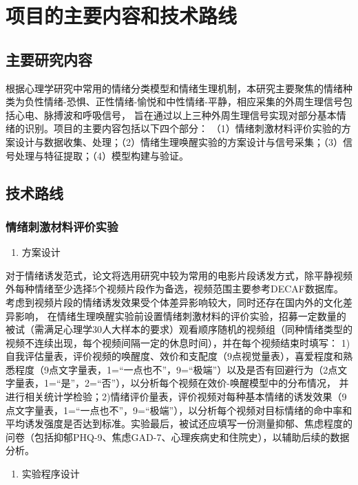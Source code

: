 \section{项目的主要内容和技术路线}

\subsection{主要研究内容}
根据心理学研究中常用的情绪分类模型和情绪生理机制，本研究主要聚焦的情绪种类为负性情绪-恐惧、正性情绪-愉悦和中性情绪-平静，相应采集的外周生理信号包括心电、脉搏波和呼吸信号，
旨在通过以上三种外周生理信号实现对部分基本情绪的识别。项目的主要内容包括以下四个部分：
（1）情绪刺激材料评价实验的方案设计与数据收集、处理；（2）情绪生理唤醒实验的方案设计与信号采集；（3）信号处理与特征提取；（4）模型构建与验证。

\subsection{技术路线}
\subsubsection{情绪刺激材料评价实验}
\begin{enumerate}[\hspace{2em}1.]
    \item 方案设计
\end{enumerate}

对于情绪诱发范式，论文将选用研究中较为常用的电影片段诱发方式，除平静视频外每种情绪至少选择5个视频片段作为备选，视频范围主要参考DECAF数据库\cite{DECAF2015}。考虑到视频片段的情绪诱发效果受个体差异影响较大，同时还存在国内外的文化差异影响，
在情绪生理唤醒实验前设置情绪刺激材料的评价实验，招募一定数量的被试（需满足心理学30人大样本的要求）观看顺序随机的视频组（同种情绪类型的视频不连续出现，每个视频间隔一定的休息时间），并在每个视频结束时填写：
1)自我评估量表，评价视频的唤醒度、效价和支配度（9点视觉量表），喜爱程度和熟悉程度（9点文字量表，1=“一点也不”，9=“极端”）以及是否有回避行为（2点文字量表，1=“是”，2=“否”），以分析每个视频在效价-唤醒模型中的分布情况，
并进行相关统计学检验；2)情绪评价量表，评价视频对每种基本情绪的诱发效果（9点文字量表，1=“一点也不”，9=“极端”），以分析每个视频对目标情绪的命中率和平均诱发强度是否达到标准。实验最后，被试还应填写一份测量抑郁、焦虑程度的问卷（包括抑郁PHQ-9、焦虑GAD-7、心理疾病史和住院史），以辅助后续的数据分析。

\begin{enumerate}[\hspace{2em}2.]
    \item 实验程序设计
\end{enumerate}


